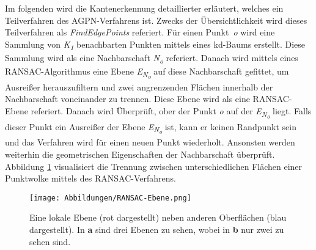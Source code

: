 Im folgenden wird die Kantenerkennung detaillierter erläutert, welches ein Teilverfahren des AGPN-Verfahrens ist. Zwecks der Übersichtlichkeit wird dieses Teilverfahren als \textit{FindEdgePoints} referiert. Für einen Punkt~\textit{o} wird eine Sammlung von \textit{K\textsubscript{1}} benachbarten Punkten mittels eines kd-Baums erstellt. Diese Sammlung wird als eine Nachbarschaft \textit{N\textsubscript{o}} referiert. Danach wird mittels eines RANSAC-Algorithmus eine Ebene \textit{E\textsubscript{N\textsubscript{o}}} auf diese Nachbarschaft gefittet, um Ausreißer herauszufiltern und zwei angrenzenden Flächen innerhalb der Nachbarschaft voneinander zu trennen. Diese Ebene wird als eine RANSAC-Ebene referiert. Danach wird Überprüft, ober der Punkt \textit{o} auf der \textit{E\textsubscript{N\textsubscript{o}}} liegt. Falls dieser Punkt ein Ausreißer der Ebene \textit{E\textsubscript{N\textsubscript{o}}} ist, kann er keinen Randpunkt sein und das Verfahren wird für einen neuen Punkt wiederholt. Ansonsten werden weiterhin die geometrischen Eigenschaften der Nachbarschaft überprüft. Abbildung \ref{RANSAC-Ebene} visualisiert die Trennung zwischen unterschiedlichen Flächen einer Punktwolke mittels des RANSAC-Verfahrens. 

\begin{figure}[h]
	\texttt{[image: Abbildungen/RANSAC-Ebene.png]}
	\centering
	\caption{Eine lokale Ebene (rot dargestellt) neben anderen Oberflächen (blau dargestellt). In \textbf{a} sind drei Ebenen zu sehen, wobei in \textbf{b} nur zwei zu sehen sind. \autocite{ni_edge_2016}}
	\label{RANSAC-Ebene}
\end{figure} 

